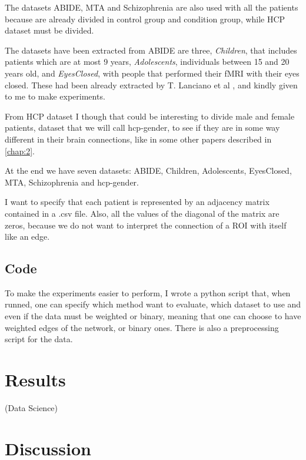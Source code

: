 The datasets ABIDE, MTA and Schizophrenia are also used with all the patients because are already divided in control group and condition group, while HCP dataset must be divided. 

The datasets have been extracted from ABIDE are three, \textit{Children}, that includes patients which are at most 9 years, \textit{Adolescents}, individuals between 15 and 20 years old, and \textit{EyesClosed}, with people that performed their fMRI with their eyes closed. These had been already extracted by T. Lanciano et al \cite{lanciano2020cs}, and kindly given to me to make experiments.

From HCP dataset I though that could be interesting to divide male and female patients, dataset that we will call hcp-gender, to see if they are in some way different in their brain connections, like in some other papers described in \ref{chap:2}. 

At the end we have seven datasets: ABIDE, Children, Adolescents, EyesClosed, MTA, Schizophrenia and hcp-gender. 

I want to specify that each patient is represented by an adjacency matrix contained in a .csv file. Also, all the values of the diagonal of the matrix are zeros, because we do not want to interpret the connection of a ROI with itself like an edge.

\subsection{Code}
To make the experiments easier to perform, I wrote a python script that, when runned, one can specify which method want to evaluate, which dataset to use and even if the data must be weighted or binary, meaning that one can choose to have weighted edges of the network, or binary ones. There is also a preprocessing script for the data.



\section{Results}
(Data Science)

\section{Discussion}
\label{sec:moons}